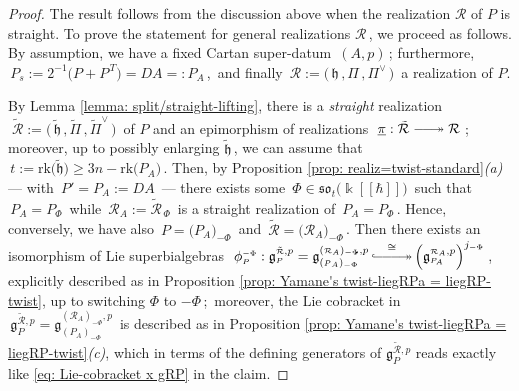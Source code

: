 \documentclass[12pt,reqno,twoside,a4paper]{amsart}
\numberwithin{equation}{section}
\theoremstyle{definition}
\newtheorem{free text}[lema]{}
\theoremstyle{remark}
\newcommand{\R}{{\mathcal R}}
\def \kh{{\Bbbk[[\hbar]]}}
\def \Apicc {{\scriptscriptstyle A}}
\def \Ppicc {{\scriptscriptstyle P}}
\def \Rpicc {{\scriptscriptstyle \R}}
\def \lieg{\mathfrak{g}}
\def \lieh{\mathfrak{h}}
\def \lieso{\mathfrak{so}}
\def \Phipicc {{\scriptscriptstyle \Phi}}
\theoremstyle{plain}
\begin{document}
\begin{proof}
%
 The result follows from the discussion above when the realization  $ \R $  of  $ P $  is straight.  To prove the statement for general realizations  $ \R \, $,  we proceed as follows.  By assumption, we have a fixed Cartan super-datum  $ \, (A,p) \, $;
%
%
 furthermore,  $ \, P_s := 2^{-1} \big( P + P^{\,\scriptscriptstyle T} \big) = DA =:
 P_{\!\Apicc} \, $,  \,and finally
 $ \, \R := \big(\, \lieh \, , \Pi \, , \Pi^\vee \,\big) \, $  a realization of  $ P $.
                                                                  \par
   By  Lemma \ref{lemma: split/straight-lifting},  there is a  \textsl{straight\/}  realization  $ \; \tilde{\R} := \big(\,\tilde{\lieh} \, , \tilde{\Pi} \, , {\tilde{\Pi}}^\vee \,\big) \, $   of  $ P $  and an epimorphism of realizations  $ \; \underline{\pi} : \tilde{\R} \relbar\joinrel\relbar\joinrel\twoheadrightarrow \R \; $;  \,moreover, up to possibly enlarging  $ \tilde{\lieh} \, $,  we can assume that  $ \, t := \text{rk}\big(\tilde{\lieh}\big) \geq 3n - \text{rk}\big(P_{\!\Apicc}\big) \, $.  Then, by  Proposition \ref{prop: realiz=twist-standard}\textit{(a)}   --- with  $ \, P' = P_{\!\Apicc} := DA \, $  ---   there exists some  $ \, \Phi \in \lieso_t\big(\kh\big) \, $  such that  $ \, P_{\!\Apicc} = P_{\scriptscriptstyle \Phi} \, $  while  $ \, \R_\Apicc := \tilde{\R}_{\,\scriptscriptstyle \Phi} \, $  is a straight realization of  $ \, P_{\!\Apicc} = P_{\scriptscriptstyle \Phi} \, $.  Hence, conversely, we have also  $ \, P = {\big( P_{\!\Apicc} \big)}_{\scriptscriptstyle -\Phi} \, $  and  $ \, \tilde{\R} = {\big( \R_\Apicc \big)}_{\scriptscriptstyle -\Phi} \, $.  Then there exists an isomorphism of Lie superbialgebras
%
  $ \; \phi^{\scriptscriptstyle -\Phi}_\Ppicc : \lieg_\Ppicc^{\tilde{\Rpicc},p} = \lieg_{(\Ppicc_\Apicc)_{-\Phipicc}}^{(\Rpicc_\Apicc)_{-\Phipicc},p} \, {\buildrel \cong \over
 {\lhook\joinrel\relbar\joinrel\relbar\joinrel\relbar\joinrel\twoheadrightarrow}} \,
{\Big( \lieg_{\Ppicc_{\!\Apicc}}^{\Rpicc_\Apicc,p} \Big)}^{j_{-\Phipicc}} \, $,
%
 \;explicitly described as in  Proposition \ref{prop: Yamane's twist-liegRPa = liegRP-twist},  up to switching  $ \Phi $  to  $ -\Phi \, $;  \,moreover, the Lie cobracket in  $ \, \lieg_\Ppicc^{\tilde{\Rpicc},p} = \lieg_{(\Ppicc_\Apicc)_{-\Phipicc}}^{(\Rpicc_\Apicc)_{-\Phipicc},p} \, $  is described as in  Proposition \ref{prop: Yamane's twist-liegRPa = liegRP-twist}\textit{(c)},  which in terms of the defining generators of  $ \lieg_\Ppicc^{\tilde{\Rpicc},p} $  reads exactly like  \eqref{eq: Lie-cobracket x gRP}  in the claim.

\end{proof}
\end{document}

